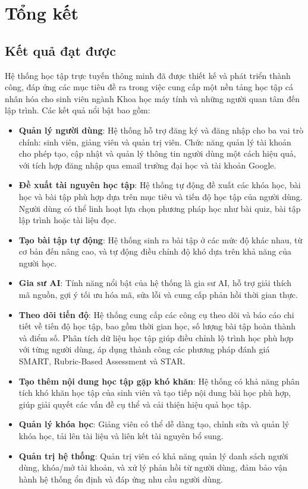 \chapter{Tổng kết}

\section{Kết quả đạt được}

Hệ thống học tập trực tuyến thông minh đã được thiết kế và phát triển thành công, đáp ứng các mục tiêu đề ra trong việc cung cấp một nền tảng học tập cá nhân hóa cho sinh viên ngành Khoa học máy tính và những người quan tâm đến lập trình. Các kết quả nổi bật bao gồm:

\begin{itemize}
	\item \textbf{Quản lý người dùng}: Hệ thống hỗ trợ đăng ký và đăng nhập cho ba vai trò chính: sinh viên, giảng viên và quản trị viên. Chức năng quản lý tài khoản cho phép tạo, cập nhật và quản lý thông tin người dùng một cách hiệu quả, với tích hợp đăng nhập qua email trường đại học và tài khoản Google.
	\item \textbf{Đề xuất tài nguyên học tập}: Hệ thống tự động đề xuất các khóa học, bài học và bài tập phù hợp dựa trên mục tiêu và tiến độ học tập của người dùng. Người dùng có thể linh hoạt lựa chọn phương pháp học như bài quiz, bài tập lập trình hoặc tài liệu đọc.
	\item \textbf{Tạo bài tập tự động}: Hệ thống sinh ra bài tập ở các mức độ khác nhau, từ cơ bản đến nâng cao, và tự động điều chỉnh độ khó dựa trên khả năng của người học.
	\item \textbf{Gia sư AI}: Tính năng nổi bật của hệ thống là gia sư AI, hỗ trợ giải thích mã nguồn, gợi ý tối ưu hóa mã, sửa lỗi và cung cấp phản hồi thời gian thực. 
	\item \textbf{Theo dõi tiến độ}: Hệ thống cung cấp các công cụ theo dõi và báo cáo chi tiết về tiến độ học tập, bao gồm thời gian học, số lượng bài tập hoàn thành và điểm số. Phân tích dữ liệu học tập giúp điều chỉnh lộ trình học phù hợp với từng người dùng, áp dụng thành công các phương pháp đánh giá SMART, Rubric-Based Assessment và STAR.
	\item \textbf{Tạo thêm nội dung học tập gặp khó khăn}: Hệ thống có khả năng phân tích khó khăn học tập của sinh viên và tạo tiếp nội dung bài học phù hợp, giúp giải quyết các vấn đề cụ thể và cải thiện hiệu quả học tập.
	\item \textbf{Quản lý khóa học}: Giảng viên có thể dễ dàng tạo, chỉnh sửa và quản lý khóa học, tải lên tài liệu và liên kết tài nguyên bổ sung. 
	\item \textbf{Quản trị hệ thống}: Quản trị viên có khả năng quản lý danh sách người dùng, khóa/mở tài khoản, và xử lý phản hồi từ người dùng, đảm bảo vận hành hệ thống ổn định và đáp ứng nhu cầu người dùng.
\end{itemize}

